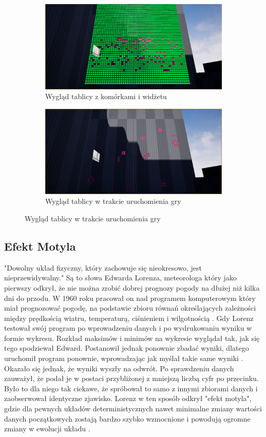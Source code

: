 \documentclass[a4paper,12pt,reqno]{article}
\begin{document}
\begin{figure}[H]%
	\centering
	\begin{subfigure}{.5\textwidth}
		\centering
		\includegraphics[width=0.8\linewidth]{graphics/gameoflife/GOLInUE_1.png}
		\caption{Wygląd tablicy z komórkami i widżetu}	
		\label{ref:subref_a}
	\end{subfigure}%
	\begin{subfigure}{.5\textwidth}
		\centering
		\includegraphics[width=0.8\linewidth]{graphics/gameoflife/GOLInUE_2.png}
		\caption{Wygląd tablicy w trakcie uruchomienia gry}
		\label{ref:subref_b}
	\end{subfigure}%
\label{ref:ref}
\end{figure}

\newpage
\subsection{Efekt Motyla}

"Dowolny układ fizyczny, który zachowuje się nieokresowo, jest nieprzewidywalny." Są to słowa Edwarda Lorenza, meteorologa który jako pierwszy odkrył, że nie można zrobić dobrej prognozy pogody na dłużej niż kilka dni do przodu. W 1960 roku pracował on nad programem komputerowym który miał prognozować pogodę, na podstawie zbioru równań określających zależności między prędkością wiatru, temperaturą, ciśnieniem i wilgotnością \cite{burze_motyle}. Gdy Lorenz testował swój program po wprowadzeniu danych i po wydrukowaniu wyniku w formie wykresu. Rozkład maksimów i minimów na wykresie wyglądał tak, jak się tego spodziewał Edward. Postanowił jednak ponownie zbadać wyniki, dlatego uruchomił program ponownie, wprowadzając jak myślał takie same wyniki \cite{burze_motyle}. Okazało się jednak, że wyniki wyszły na odwrót. Po sprawdzeniu danych zauważył, że podał je w postaci przybliżonej z mniejszą liczbą cyfr po przecinku. Było to dla niego tak ciekawe, że spróbował to samo z innymi zbiorami danych i zaobserwował identyczne zjawisko. Lorenz w ten sposób odkrył "efekt motyla", gdzie dla pewnych układów deterministycznych nawet minimalne zmiany wartości danych początkowych zostają bardzo szybko wzmocnione i powodują ogromne zmiany w ewolucji układu \cite{burze_motyle}.
\end{document}
